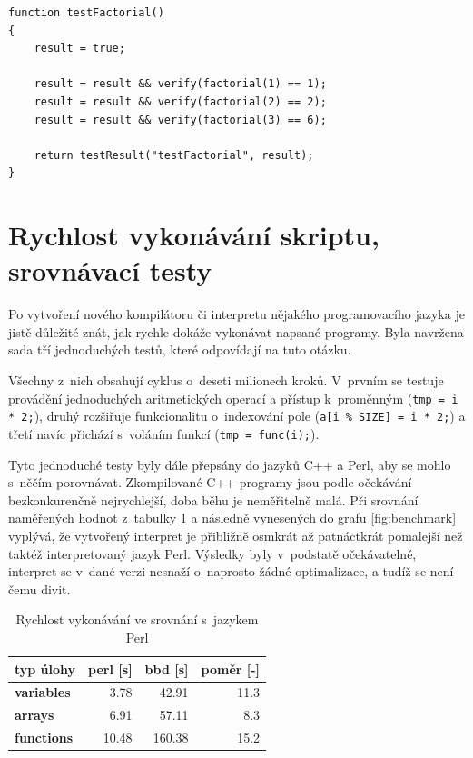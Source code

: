 \documentclass[11pt,twoside,a4paper]{book}
\begin{document}
\begin{verbatim}
function testFactorial()
{
    result = true;

    result = result && verify(factorial(1) == 1);
    result = result && verify(factorial(2) == 2);
    result = result && verify(factorial(3) == 6);

    return testResult("testFactorial", result);
}
\end{verbatim}


\section{Rychlost vykonávání skriptu, srovnávací testy}
\label{rychlost_vykonavani_skriptu_srovnavaci_testy}

Po vytvoření nového kompilátoru či interpretu nějakého programovacího jazyka je jistě dů\-le\-ži\-té znát, jak rychle dokáže vykonávat napsané programy. Byla navržena sada tří jednoduchých testů, které odpovídají na tuto otázku.

Všechny z~nich obsahují cyklus o~deseti milionech kroků. V~prvním se testuje provádění jednoduchých aritmetických operací a přístup k~proměnným (\texttt{tmp = i * 2;}), druhý rozšiřuje funkcionalitu o~indexování pole (\texttt{a[i \% SIZE] = i * 2;}) a třetí navíc přichází s~voláním funkcí (\texttt{tmp = func(i);}).

Tyto jednoduché testy byly dále přepsány do jazyků C++ a Perl, aby se mohlo s~něčím porovnávat. Zkompilované C++ programy jsou podle očekávání bezkonkurenčně nejrychlejší, doba běhu je neměřitelně malá. Při srovnání naměřených hodnot z~tabulky \ref{tab:benchmark} a následně vynesených do grafu \ref{fig:benchmark} vyplývá, že vytvořený interpret je přibližně osmkrát až patnáctkrát pomalejší než taktéž interpretovaný jazyk Perl. Výsledky byly v~podstatě očekávatelné, interpret se v~dané verzi nesnaží o~naprosto žádné optimalizace, a tudíž se není čemu divit.

\begin{table}
\begin{center}
\begin{tabular}{|l||r|r||r|}
\hline
\textbf{typ úlohy} & \textbf{perl [s]} & \textbf{bbd [s]} & \textbf{poměr [-]} \\
\hline \hline
\bf{variables} & 3.78 & 42.91 & 11.3 \\
\hline
\bf{arrays} & 6.91 & 57.11 & 8.3 \\
\hline
\bf{functions} & 10.48 & 160.38 & 15.2 \\
\hline
\end{tabular}
\end{center}
\caption{Rychlost vykonávání ve srovnání s~jazykem Perl}
\label{tab:benchmark}
\end{table}
\end{document}

